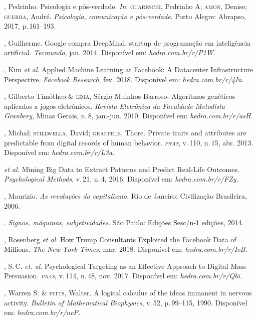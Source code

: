 \begin{bibliohedra}
, Pedrinho. Psicologia e pós-verdade. \textit{In}:
\textsc{guareschi}, Pedrinho A; \textsc{amon}, Denise; \textsc{guerra}, André. \textit{Psicologia, comunicação e pós-verdade}. Porto Alegre: Abrapso, 2017, p.\,161--193.

, Guilherme. Google compra DeepMind, startup de programação
em inteligência artificial. \textit{Tecmundo}, jan. 2014. Disponível em: \textit{hedra.com.br/r/P1W}.

, Kim \textit{et al}. Applied Machine Learning at Facebook: A
Datacenter Infrastructure Perspective. \textit{Facebook Research}, fev. 2018. Disponível em: \textit{hedra.com.br/r/4In}.

, Gilberto Timótheo \& \textsc{lima}, Sérgio Muinhos Barroso.
Algoritmos genéticos aplicados a jogos eletrônicos. \textit{Revista
Eletrônica da Faculdade Metodista Granbery}, Minas Gerais, n.\,8, jan.-jun. 2010. Disponível em: \textit{hedra.com.br/r/asH}.

, Michal; \textsc{stillwella}, David; \textsc{graepelb}, Thore.
Private traits and attributes are predictable from digital
records of human behavior. \textit{\textsc{pnas}}, v.\,110, n.\,15, abr. 2013.
Disponível em: \textit{hedra.com.br/r/L3a}.

\titidem\mbox{} \textit{et al.} Mining Big Data to Extract Patterns and Predict Real-Life
Outcomes. \textit{Psychological Methods}, v.\,21, n.\,4, 2016. Disponível em: \textit{hedra.com.br/r/FZy}.

, Maurizio. \textit{As revoluções do capitalismo.} Rio de
Janeiro: Civilização Brasileira, 2006.

\titidem. \textit{Signos, máquinas, subjetividades.} São
Paulo: Edições Sesc/n-1 edições, 2014.

, Rosenberg \textit{et al}. How Trump Consultants Exploited the
Facebook Data of Millions. \textit{The New York Times}, mar. 2018. Disponível em: \textit{hedra.com.br/r/IcB}.

, S.\,C. \textit{et. al}.
Psychological Targeting as an Effective Approach to Digital Mass
Persuasion. \textit{\textsc{pnas}}, v.\,114, n.\,48, nov. 2017. Disponível em: \textit{hedra.com.br/r/Qbi}.

, Warren S. \& \textsc{pitts}, Walter. A logical calculus of the
ideas immanent in nervous activity. \textit{Bulletin of Mathematical
Biophysics}, v.\,52, p.\,99--115, 1990. Disponível em: \textit{hedra.com.br/r/neP}.


\end{bibliohedra}

